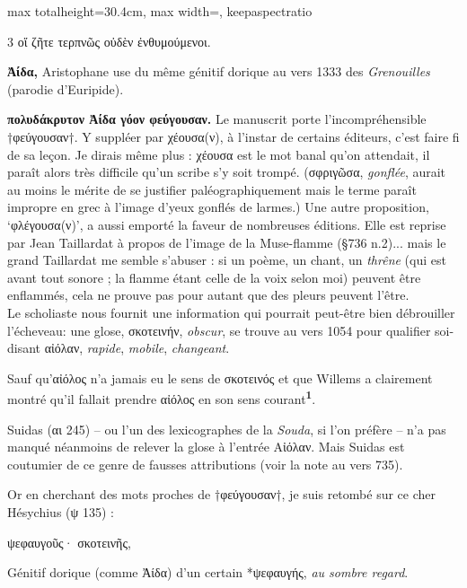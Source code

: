 \documentclass[11pt,twoside]{book}
\newcommand{\italique}[1]{\textit{#1}}
\newcommand{\citComm}[1]{\begin{quoting}[vskip=0.4pt,leftmargin=0.7em,rightmargin=0.2em]#1\end{quoting}}
\newcommand{\marqueur}[1]{\textsuperscript{\color{rubricRed}\textbf{#1}}}
\begin{document}
\begin{adjustbox}{max totalheight=30.4cm, max width=\textwidth, keepaspectratio}
\begin{minipage}{\textwidth}
{\begin{multicols}{3}
{οἵ ζῆτε τερπνῶς οὐδὲν ἐνθυμούμενοι.}
\par\vspace{1.5pt}
 \textbf{Ἀίδα,} Aristophane use du même génitif dorique au vers 1333 des \italique{Grenouilles} (parodie d'Euripide).
\par\vspace{1.5pt}
 \textbf{πολυδάκρυτον Ἀίδα γόον φεύγουσαν.} Le manuscrit porte l'incompréhensible †φεύγουσαν†. Y suppléer par χέουσα(ν), à l'instar de certains éditeurs, c'est faire fi de sa leçon. Je dirais même plus : χέουσα est le mot banal qu'on attendait, il paraît alors très difficile qu'un scribe s'y soit trompé. (σφριγῶσα, \italique{gonflée}, aurait au moins le mérite de se justifier paléographiquement mais le terme paraît impropre en grec à l'image d'yeux gonflés de larmes.) Une autre proposition, `φλέγουσα(ν)', a aussi emporté la faveur de nombreuses éditions. Elle est reprise par Jean Taillardat à propos de l'image de la Muse-flamme (§736 n.2)... mais le grand Taillardat me semble s'abuser : si un poème, un chant, un \italique{thrêne} (qui est avant tout sonore ; la flamme étant celle de la voix selon moi) peuvent être enflammés, cela ne prouve pas pour autant que des pleurs peuvent l'être.\\ Le scholiaste nous fournit une information qui pourrait peut-être bien débrouiller l'écheveau: une glose, σκοτεινήν, \italique{obscur}, se trouve au vers 1054 pour qualifier soi-disant αἰόλαν, \italique{rapide}, \italique{mobile}, \italique{changeant}.
\par\vspace{1.5pt}
\noindent Sauf qu'αἰόλος n'a jamais eu le sens de σκοτεινός et que Willems a clairement montré qu'il fallait prendre αἰόλος en son sens courant\marqueur{1}.
\par\vspace{1.5pt}
\noindent Suidas (αι 245) -- ou l'un des lexicographes de la \italique{Souda}, si l'on préfère -- n'a pas manqué néanmoins de relever la glose à l'entrée Αἰόλαν. Mais Suidas est coutumier de ce genre de fausses attributions (voir la note au vers 735).
\par\vspace{1.5pt}
\noindent Or en cherchant des mots proches de †φεύγουσαν†, je suis retombé sur ce cher Hésychius (ψ 135) :
\citComm{ψεφαυγοῦς· σκοτεινῆς,}
\par\vspace{1.5pt}
\noindent Génitif dorique (comme Ἀίδα) d'un certain *ψεφαυγής, \italique{au sombre regard}.

\end{multicols}}
\end{minipage}
\end{adjustbox}
\end{document}
